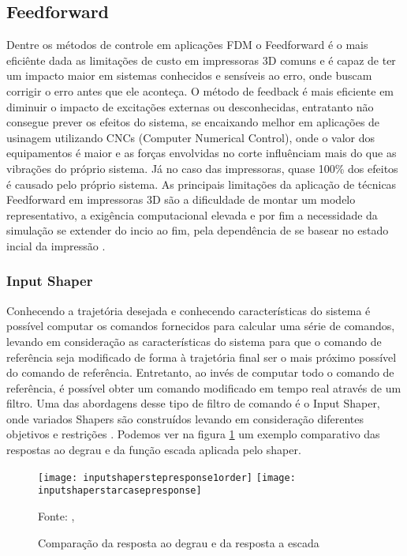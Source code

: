 \subsection{Feedforward}
Dentre os métodos de controle em aplicações FDM o Feedforward 
é o mais eficiênte dada as limitações de custo em impressoras 
3D comuns e é capaz de ter um impacto maior em sistemas 
conhecidos e sensíveis ao erro, onde buscam corrigir o erro 
antes que ele aconteça. O método de feedback é mais eficiente em
diminuir o impacto de excitações externas ou desconhecidas,
entratanto não consegue prever os efeitos do sistema, se encaixando
melhor em aplicações de usinagem utilizando CNCs (Computer Numerical Control),
onde o valor dos equipamentos é maior e as forças envolvidas no corte
influênciam mais do que as vibrações do próprio sistema.
Já no caso das impressoras, quase 100\% dos efeitos é causado pelo próprio
sistema. As principais limitações da aplicação de técnicas Feedforward
em impressoras 3D são a dificuldade de montar um modelo representativo,
a exigência computacional elevada e por fim a necessidade da simulação
se extender do incio ao fim, pela dependência de se basear no estado 
incial da impressão \cite{ramani20,duan18}.

\subsubsection{Input Shaper}
Conhecendo a trajetória desejada e conhecendo características 
do sistema é possível computar os comandos fornecidos para 
calcular uma série de comandos, levando em consideração as 
características do sistema para que o comando de referência 
seja modificado de forma à trajetória final ser o mais próximo 
possível do comando de referência. Entretanto, ao invés de 
computar todo o comando de referência, é possível obter um 
comando modificado em tempo real através de um filtro. 
Uma das abordagens desse tipo de filtro de comando é o 
Input Shaper, onde variados Shapers são construídos levando 
em consideração diferentes objetivos e restrições
\cite{singhose97}.
Podemos
ver na figura \ref{fig:degr_vs_esc} um exemplo comparativo
das respostas ao degrau e da função escada aplicada pelo shaper.

\begin{figure}[!htb]
    \centering
    \caption{Comparação da resposta ao degrau e da resposta a escada}
    \texttt{[image: inputshaperstepresponse1order]}
    \texttt{[image: inputshaperstarcasepresponse]}

    {\footnotesize Fonte: \citeauthor{singhose97}, \citeyear{singhose97}}
    \label{fig:degr_vs_esc}
\end{figure}

